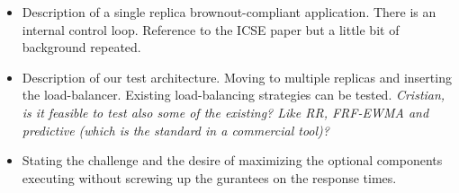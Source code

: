 \begin{itemize}
\item Description of a single replica brownout-compliant
  application. There is an internal control loop. Reference to the
  ICSE paper but a little bit of background repeated.
\item Description of our test architecture. Moving to multiple
  replicas and inserting the load-balancer. Existing load-balancing
  strategies can be tested. \textit{Cristian, is it feasible to test
    also some of the existing? Like RR, FRF-EWMA and predictive (which
    is the standard in a commercial tool)?}
\item Stating the challenge and the desire of maximizing the optional
  components executing without screwing up the gurantees on the
  response times.
\end{itemize}